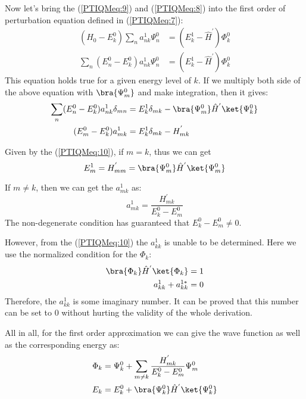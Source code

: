 Now let's bring the (\ref{PTIQMeq:9}) and (\ref{PTIQMeq:8}) into the
first order of perturbation equation defined in (\ref{PTIQMeq:7}):
\begin{align}\label{}
(\hat{H}_{0} - E^{0}_{k})\sum_{n}a^{1}_{nk}\Psi^{0}_{n} &=
(E^{1}_{k} - \hat{H}^{'})\Phi^{0}_{k} \nonumber \\
\sum_{n}(E^{0}_{n} - E^{0}_{k})a^{1}_{nk}\Psi^{0}_{n} &= (E^{1}_{k}
- \hat{H}^{'})\Phi^{0}_{k}
\end{align}
This equation holds true for a given energy level of $k$. If we
multiply both side of the above equation with $\bra{\Psi^{0}_{m}}$
and make integration, then it gives:
\begin{align}\label{PTIQMeq:10}
\sum_{n}(E^{0}_{n} - E^{0}_{k})a^{1}_{nk}\delta_{mn} &=
E^{1}_{k}\delta_{mk} -
\bra{\Psi^{0}_{m}}\hat{H}^{'}\ket{\Psi^{0}_{k}} \nonumber \\
(E^{0}_{m} - E^{0}_{k})a^{1}_{mk} &= E^{1}_{k}\delta_{mk} -
H^{'}_{mk}
\end{align}

Given by the (\ref{PTIQMeq:10}), if $m=k$, thus we can get
\begin{equation}\label{}
E^{1}_{m} = H^{'}_{mm} =
\bra{\Psi^{0}_{m}}\hat{H}^{'}\ket{\Psi^{0}_{m}}
\end{equation}

If $m\neq k$, then we can get the $a^{1}_{mk}$ as:
\begin{equation}\label{}
a^{1}_{mk} = \frac{H^{'}_{mk}}{E^{0}_{k} - E^{0}_{m}}
\end{equation}
The non-degenerate condition has guaranteed that $E^{0}_{k} -
E^{0}_{m} \neq 0$.

However, from the (\ref{PTIQMeq:10}) the $a^{1}_{kk}$ is unable to
be determined. Here we use the normalized condition for the
$\Phi_{k}$:
\begin{align}\label{}
\bra{\Phi_{k}}\hat{H}^{'}\ket{\Phi_{k}} &= 1 \nonumber \\
a^{1}_{kk} + a^{1*}_{kk} &= 0
\end{align}
Therefore, the $a^{1}_{kk}$ is some imaginary number. It can be
proved that this number can be set to $0$ without hurting the
validity of the whole derivation.

All in all, for the first order approximation we can give the wave
function as well as the corresponding energy as:
\begin{align}\label{PTIQMeq:11}
\Phi_{k} &= \Psi^{0}_{k} + \sum_{m\neq k}\frac{H^{'}_{mk}}{E^{0}_{k}
- E^{0}_{m}}\Psi^{0}_{m} \nonumber \\
E_{k} &= E_{k}^{0} + \bra{\Psi^{0}_{k}}\hat{H}^{'}\ket{\Psi^{0}_{k}}
\end{align}

